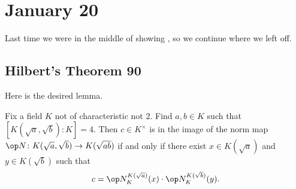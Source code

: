 \documentclass[../notes.tex]{subfiles}
\begin{document}
\section{January 20}

Last time we were in the middle of showing , so we continue where we left off.

\subsection{Hilbert's Theorem 90}
Here is the desired lemma.
\begin{lemma} \label{lem:begins-cohom}
	Fix a field $K$ not of characteristic not $2$. Find $a,b\in K$ such that $[K(\sqrt a,\sqrt b):K]=4$. Then $c\in K^\times$ is in the image of the norm map ${\op N}\colon K(\sqrt a,\sqrt b)\to K(\sqrt{ab})$ if and only if there exist $x\in K(\sqrt a)$ and $y\in K(\sqrt b)$ such that
	\[c=\op N^{K(\sqrt a)}_K(x)\cdot\op N^{K(\sqrt b)}_K(y).\]
\end{lemma}
\end{document}

